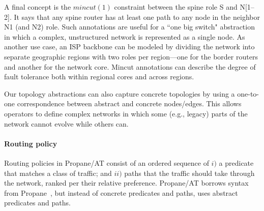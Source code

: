 \documentclass[numbers, 10pt]{sigplanconf}
\newcommand{\sysname}{{\text{}\small \sf Propane/AT}\xspace}
\newcommand{\Propane}{{\text{}\small \sf Propane}\xspace}
\newcommand{\para}[1]{\paragraph*{\textbf{#1}}}
\newcommand{\Mincut}{\mathit{mincut}}
\begin{document}
A final concept is the $\Mincut(1)$ constraint between the spine role S and N[1--2]. It says that any spine router has at least one path to any node in the neighbor N1 (and N2) role. Such annotations are useful for a ``one big switch" abstraction \cite{Casado:2010} in which a complex, unstructured network is represented as a single node. As another use case, an ISP backbone can be modeled by dividing the network into separate geographic regions with two roles per region---one for the border routers and another for the network core. Mincut annotations can describe the degree of fault tolerance both within regional cores and across regions.

Our topology abstractions can also capture concrete topologies by using a one-to-one correspondence between abstract and concrete nodes/edges. This allows operators to define complex networks in which some (e.g., legacy) parts of the network cannot evolve while others can.


%


\para{Routing policy} Routing policies in \sysname consist of an ordered sequence of $i)$ a predicate that matches a class of traffic; and $ii)$ paths that the traffic should take through the network, ranked per their relative preference. \sysname borrows syntax from \Propane~\cite{propane}, but instead of concrete predicates and paths, uses abstract predicates and paths.
\end{document}
